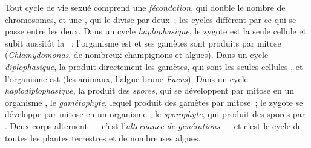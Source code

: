 \begin{definition}\label{def:b2:plant-life-cycles:cycles}
Tout cycle de vie sexué comprend une \emph{fécondation}, qui double le
nombre de chromosomes, et une \emph{}, qui le divise par deux~;
les cycles diffèrent par ce qui se passe entre les deux. Dans un cycle
\emph{haplophasique}, le zygote est la seule cellule  et subit
aussitôt la ~; l'organisme est  et ses gamètes sont
produits par mitose (\emph{Chlamydomonas}, de nombreux champignons et
algues). Dans un cycle \emph{diplophasique}, la  produit
directement les gamètes, qui sont les seules cellules , et
l'organisme est  (les animaux, l'algue brune \emph{Fucus}).
Dans un cycle \emph{haplodiplophasique}, la  produit des
\emph{spores}, qui se développent par mitose en un organisme ,
le \emph{gamétophyte}, lequel produit des gamètes par mitose~; le
zygote se développe par mitose en un organisme , le
\emph{sporophyte}, qui produit des spores par . Deux corps
 alternent --- c'est l'\emph{alternance de
générations} --- et c'est le cycle de toutes les plantes terrestres et
de nombreuses algues.
\end{definition}


